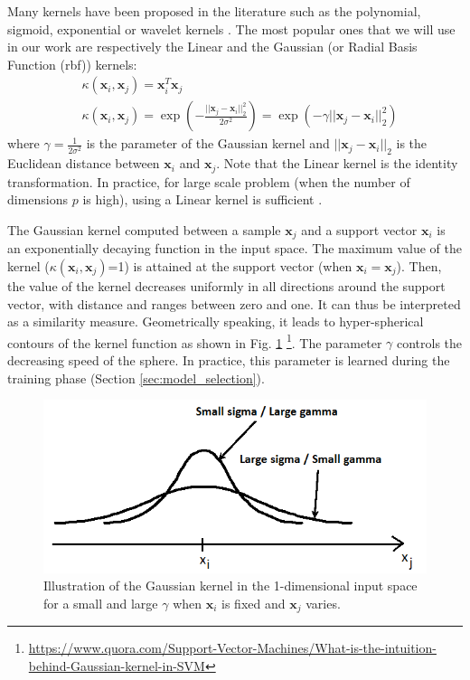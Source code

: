 Many kernels have been proposed in the literature such as the polynomial, sigmoid, exponential or wavelet kernels \cite{Schlkopf2013}. The most popular ones that we will use in our work are respectively the Linear and the Gaussian (or Radial Basis Function ({\sc rbf})) kernels:
\begin{align}
	& \kappa(\textbf{x}_i,\textbf{x}_j)= \textbf{x}_i ^T \textbf{x}_j \\
	& \kappa(\textbf{x}_i,\textbf{x}_j)
	= \exp\left( -\frac{||\textbf{x}_j-\textbf{x}_i||_2^2}{2\sigma^2}\right) 
	= \exp\left( -\gamma||\textbf{x}_j-\textbf{x}_i||_2^2\right) 
\end{align}
where $\gamma = \frac{1}{2\sigma^2}$ is the parameter of the Gaussian kernel and $||\textbf{x}_j-\textbf{x}_i||_2$ is the Euclidean distance between $\textbf{x}_i$ and $\textbf{x}_j$. Note that the Linear kernel is the identity transformation. In practice, for large scale problem (when the number of dimensions $p$ is high), using a Linear kernel is sufficient  \cite{Fan2008}.

The Gaussian kernel computed between a sample $\textbf{x}_j$ and a support vector $\textbf{x}_i$ is an exponentially decaying function in the input space. The maximum value of the kernel ($\kappa(\textbf{x}_i,\textbf{x}_j)$=1) is attained at the support vector (when $\textbf{x}_i=\textbf{x}_j$). Then, the value of the kernel decreases uniformly in all directions around the support vector, with distance and ranges between zero and one. It can thus be interpreted as a similarity measure. Geometrically speaking, it leads to hyper-spherical contours of the kernel function as shown in Fig. \ref{fig:Kernel_Gaussian} \footnote{\url{https://www.quora.com/Support-Vector-Machines/What-is-the-intuition-behind-Gaussian-kernel-in-SVM}}. The parameter $\gamma$ controls the decreasing speed of the sphere. In practice, this parameter is learned during the training phase (Section \ref{sec:model_selection}).

\begin{figure}[h!]
\centering
\includegraphics[width=0.6\linewidth]{images/Kernel_Gaussian2}
\caption{Illustration of the Gaussian kernel in the 1-dimensional input space for a small and large $\gamma$ when $\textbf{x}_i$ is fixed and $\textbf{x}_j$ varies.}
\label{fig:Kernel_Gaussian}
\end{figure}


